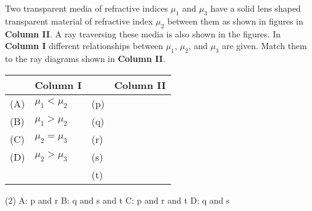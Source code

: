 
\item Two transparent media of refractive indices $\mu_1$ and $\mu_3$ have a solid lens shaped transparent material of refractive index $\mu_2$ between them as shown in figures in \textbf{Column II}. A ray traversing these media is also shown in the figures. In \textbf{Column I} different relationships between $\mu_1$, $\mu_2$, and $\mu_3$ are given. Match them to the ray diagrams shown in \textbf{Column II}.

\begin{center}
    \renewcommand{\arraystretch}{2}
    \begin{table}[h]
        \centering
        \begin{tabular}{p{0.25cm}p{8cm}|p{0.25cm}p{5cm}}
        \hline
        & Column I & &Column II \\
        \hline
        (A)& $\mu_1 < \mu_2$ & (p) & \begin{tikzpicture}
        \end{tikzpicture}\\
        (B)& $\mu_1 > \mu_2$ & (q) & \begin{tikzpicture}
        \end{tikzpicture}\\
        (C)& $\mu_2 = \mu_3$  & (r) & \begin{tikzpicture}
        \end{tikzpicture}\\
        (D)& $\mu_2 > \mu_3$ & (s) & \begin{tikzpicture}
        \end{tikzpicture}\\
        & & (t) & \begin{tikzpicture}
        \end{tikzpicture}\\
        \hline
        \end{tabular}
    \end{table}
\end{center}

\begin{tasks}(2)
    \task A: p and r
    \task B: q and s and t
    \task C: p and r and t
    \task D: q and s
\end{tasks}
